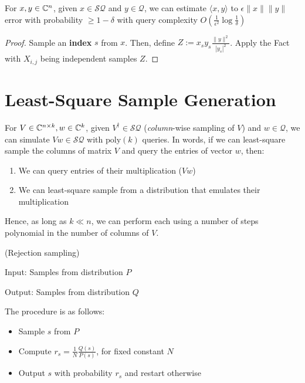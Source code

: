 \documentclass[main.tex]{subfiles}
\begin{document}
\begin{corollary} For $x,y \in\mathbb{C}^n$, given $x \in \mathcal{SQ}$ and $y \in \mathcal{Q}$, we can estimate $\langle x,y\rangle$ to $\epsilon\|x\|\|y\|$ error with probability $\geq 1-\delta$ with query complexity $O(\frac{1}{\epsilon^2}\log\frac{1}{\delta})$
\end{corollary}
\begin{proof}Sample an \textbf{index} $s$ from $x$. Then, define $Z := x_s y_s\frac{\|y\|^2}{|y_s|^2}$. Apply the Fact with $X_{i,j}$ being independent samples $Z$.
\end{proof}	

\section{Least-Square Sample Generation}

For $V \in \mathbb{C}^{n\times k}, w \in \mathbb{C}^k$, given $V^\dagger \in \mathcal{SQ}$ (\textit{column}-wise sampling of $V$) and $w \in \mathcal{Q}$, we can simulate $Vw \in \mathcal{SQ}$ with $\text{poly}(k)$ queries. In words, if we can least-square sample the columns of matrix $V$ and query the entries of vector $w$, then: 

\begin{enumerate}
\item  We can query entries of their multiplication ($Vw$) 
\item We can least-square sample from a distribution that emulates their multiplication	
\end{enumerate}

Hence, as long as $k \ll n$, we can perform  each using a number of steps polynomial in the number of columns of $V$. 

\begin{algorithm}(Rejection sampling)

Input: Samples from distribution $P$

Output: Samples from distribution $Q$

The procedure is as follows:

\begin{itemize}
\item Sample $s$ from $P$
\item Compute $r_s = \frac{1}{N}\frac{Q(s)}{P(s)}$, for fixed constant $N$
\item Output $s$ with probability $r_s$ and restart otherwise
\end{itemize}
\end{algorithm}
\end{document}
